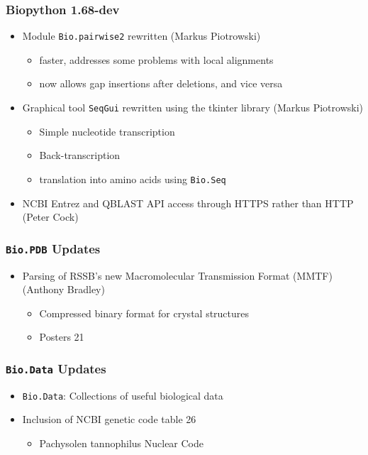 \documentclass[trans]{beamer}
\begin{document}
\frame
{
  \frametitle{Biopython 1.68-dev}

  \begin{itemize}
  \item Module \texttt{Bio.pairwise2} rewritten (Markus Piotrowski)
  \begin{itemize}
  \item faster, addresses some problems with local alignments
  \item now allows gap insertions after deletions, and vice versa
  \end{itemize}

  \item Graphical tool \texttt{SeqGui} rewritten using the tkinter library (Markus Piotrowski)
  \begin{itemize}
  \item Simple nucleotide transcription
  \item Back-transcription
  \item translation into amino acids using \texttt{Bio.Seq}
  \end{itemize}

  \item NCBI Entrez and QBLAST API access through HTTPS rather than HTTP (Peter Cock)
  
  \end{itemize}
}

\frame
{
  \frametitle{\texttt{Bio.PDB} Updates}
  
  \begin{itemize}
  \item Parsing of RSSB's new Macromolecular Transmission Format (MMTF) (Anthony Bradley)
  \begin{itemize}
  \item Compressed binary format for crystal structures
  \item Posters 21
  \end{itemize}
  \end{itemize}
  
  
}

\frame
{
  \frametitle{\texttt{Bio.Data} Updates}
  
  \begin{itemize}
  \item \texttt{Bio.Data}: Collections of useful biological data
  \item Inclusion of NCBI genetic code table 26
  \begin{itemize}
  \item Pachysolen tannophilus Nuclear Code
  \end{itemize}
  \end{itemize}
}
\end{document}
